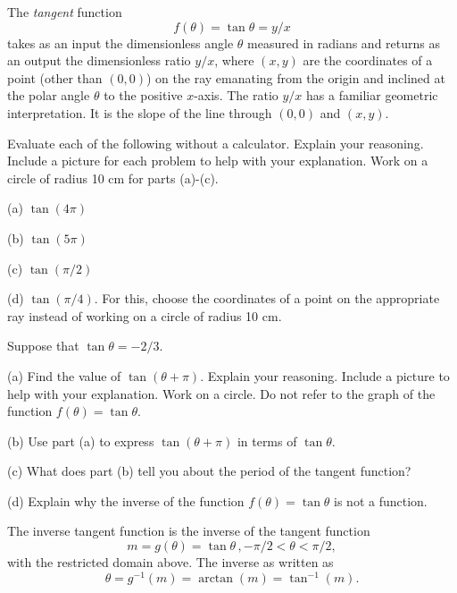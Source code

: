 \documentclass{ximera}
\begin{document}
The \emph{tangent} function 
\[
   f(\theta) = \tan \theta = y/x
\]
takes as an input the dimensionless angle $\theta$ measured in radians and returns as an output the dimensionless ratio $y/x$, where $(x,y)$ are the coordinates of a point (other than $(0,0)$) on the ray emanating from the origin and inclined at the polar angle $\theta$ to the positive $x$-axis. The ratio $y/x$ has a familiar geometric interpretation. It is the slope of the line through $(0,0)$ and $(x,y)$.



\begin{question}   \label{Q9:InverseTrig}
Evaluate each of the following without a calculator. Explain your reasoning. Include a picture for each problem to help with your explanation. Work on a circle of radius 10 cm for parts (a)-(c).

(a) $\tan (4\pi)$

(b) $\tan (5\pi)$

(c) $\tan (\pi/2)$

(d) $\tan (\pi/4)$. For this, choose the coordinates of a point on the appropriate ray instead of working on a circle of radius 10 cm.

\end{question}


\begin{question}   \label{Q11:InverseTrig}
Suppose that $\tan\theta = -2/3$.

(a) Find the value of $\tan (\theta + \pi)$. Explain your reasoning. Include a picture to help with your explanation. Work on a circle. Do not refer to the graph of the function $f(\theta) = \tan\theta$.

(b) Use part (a) to express $\tan(\theta + \pi)$ in terms of $\tan\theta$. 

(c) What does part (b) tell you about the period of the tangent function?

(d) Explain why the inverse of the function $f(\theta) = \tan\theta$ is not a function.

\end{question}

The inverse tangent function is the inverse of the tangent function
\[
   m = g(\theta) = \tan \theta \, , -\pi/2 < \theta < \pi/2 ,
\]
with the restricted domain above. The inverse as written as
\[
    \theta = g^{-1}(m) = \arctan (m) = \tan^{-1}(m) .
\]
\end{document}
